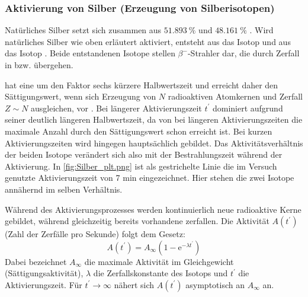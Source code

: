 \subsubsection{Aktivierung von Silber (Erzeugung von Silberisotopen)}
\label{sec:silberaktivierung}
Natürliches Silber\autocite{Silber} setzt sich zusammen aus \(\qty{51.893}{\percent}\)  und \(\qty{48.161}{\percent}\) . Wird natürliches Silber wie oben erläutert aktiviert, entsteht aus  das Isotop  und aus  das Isotop . Beide entstandenen Isotope stellen \(\beta^-\)-Strahler dar, die durch Zerfall in  bzw.  übergehen.

 hat eine um den Faktor sechs kürzere Halbwertszeit und erreicht daher den Sättigungswert, wenn sich Erzeugung von \(N\) radioaktiven Atomkernen und Zerfall \(Z\sim N\) ausgleichen, vor . Bei längerer Aktivierungszeit \(t^\prime\) dominiert  aufgrund seiner deutlich längeren Halbwertszeit, da von  bei längeren Aktivierungszeiten die maximale Anzahl durch den Sättigungswert schon erreicht ist. Bei kurzen Aktivierungszeiten wird hingegen hauptsächlich  gebildet. Das Aktivitätsverhältnis der beiden Isotope verändert sich also mit der Bestrahlungszeit während der Aktivierung. In \cref{fig:Silber_plt.png} ist als gestrichelte Linie die im Versuch genutzte Aktivierungszeit von 7 min eingezeichnet. Hier stehen die zwei Isotope annähernd im selben Verhältnis.

\FloatBarrier

Während des Aktivierungsprozesses werden kontinuierlich neue radioaktive Kerne gebildet, während gleichzeitig bereits vorhandene zerfallen. Die Aktivität \(A(t^\prime)\) (Zahl der Zerfälle pro Sekunde) folgt dem Gesetz:
\begin{equation} \label{eq:aktivitaet_buildup}
    A(t^\prime) = A_{\infty}\left(1 - \mathrm{e}^{-\lambda t^\prime}\right)
\end{equation}
Dabei bezeichnet \(A_{\infty}\) die maximale Aktivität im Gleichgewicht (Sättigungsaktivität), \(\lambda\) die Zerfallskonstante des Isotops und \(t^\prime\) die Aktivierungszeit. Für \(t^\prime \rightarrow \infty\) nähert sich \(A(t^\prime)\) asymptotisch an \(A_{\infty}\) an.

